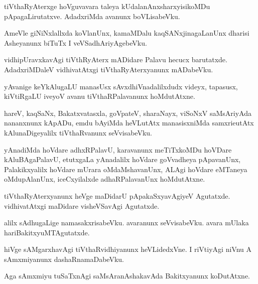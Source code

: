 \documentclass{article}
\begin{document}
\begin{mn}%
tiVthaRyAterxge hoVguvavara taleya kUdalanAnxsharxyisikoMDu pApagaLirutatxve. AdadxriMda 
avanunx boVLisabeVku.
\end{mn}

\begin{mn}%
AmeVle giNiNxlallxda koVlanUnx, kamaMDalu kaqSANxjinagaLanUnx dharisi Asheyanunx biTuTx I 
veVSadhAriyAgebeVku.
\end{mn}

\begin{mn}%
vidhipUravxkavAgi tiVthRyAterx mADidare Palavu hecucx barutatxde. AdadxriMDaleV 
vidhivatAtxgi tiVthaRyAterxyanunx mADabeVku.
\end{mn}

\begin{mn}%
yAvanige keYkAlugaLU manasUsx sAvxdhiVnadalilxdudx videyx, tapasusx, kiVtiRgaLU iveyoV 
avanu tiVthaRPalavanunx hoMdutAtxne.
\end{mn}

\begin{mn}%
hareV, kaqSaNx, Bakatxvatasxla, goVpateV, sharaNayx, viSoNxV saMsAriyAda nananxnunx 
kApADu, emdu bAyiMda heVLutAtx manasisxniMda samxrieutAtx kAlunaDigeyalilx tiVthaRvanunx 
seVvisabeVku.
\end{mn}

\begin{mn}%
yAnadiMda hoVdare adhxRPalavU, karavanunx meTiTxkoMDu hoVDare kAluBAgaPalavU, etutxgaLa 
yAnadalilx hoVdare goVvadheya pApavanUnx, Palakikxyalilx hoVdare mUrara oMdaMshavanUnx, 
ALAgi hoVdare eMTaneya oMdupAlanUnx, iceCxyilalxde adhaRPalavanUnx hoMdutAtxne.
\end{mn}

\begin{mn}%
tiVthaRyAterxyanunx heVge maDidarU pApakaSxyavAgiyeV Agutatxde. vidhivatAtxgi maDidare 
visheVSavAgi Agutatxde.
\end{mn}

\begin{mn}%
alilx sAdhugaLige namasakxrisabeVku. avaranunx seVvisabeVku. avara mUlaka 
hariBakitxyuMTAgutatxde.
\end{mn}

\begin{mn}%
hiVge sAMgarxhavAgi tiVthaRvidhiyanunx heVLidedxVne. I riVtiyAgi niVnu A sAmxmiyanunx 
dashaRnamaDabeVku.
\end{mn}

\begin{mn}%
Aga sAmxmiyu tuSaTxnAgi saMsAranAshakavAda Bakitxyanunx koDutAtxne.
\end{mn}
\end{document}
